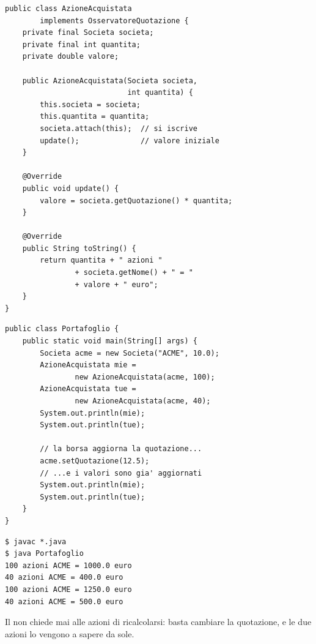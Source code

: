 \noindent\begin{minipage}[t]{0.49\textwidth}
\begin{lstlisting}[style=java, name=AzioneAcquistata.java]
public class AzioneAcquistata
        implements OsservatoreQuotazione {
    private final Societa societa;
    private final int quantita;
    private double valore;

    public AzioneAcquistata(Societa societa,
                            int quantita) {
        this.societa = societa;
        this.quantita = quantita;
        societa.attach(this);  // si iscrive
        update();              // valore iniziale
    }

    @Override
    public void update() {
        valore = societa.getQuotazione() * quantita;
    }

    @Override
    public String toString() {
        return quantita + " azioni "
                + societa.getNome() + " = "
                + valore + " euro";
    }
}
\end{lstlisting}
\end{minipage}\hfill
\begin{minipage}[t]{0.49\textwidth}
\begin{lstlisting}[style=java, name=Portafoglio.java]
public class Portafoglio {
    public static void main(String[] args) {
        Societa acme = new Societa("ACME", 10.0);
        AzioneAcquistata mie =
                new AzioneAcquistata(acme, 100);
        AzioneAcquistata tue =
                new AzioneAcquistata(acme, 40);
        System.out.println(mie);
        System.out.println(tue);

        // la borsa aggiorna la quotazione...
        acme.setQuotazione(12.5);
        // ...e i valori sono gia' aggiornati
        System.out.println(mie);
        System.out.println(tue);
    }
}
\end{lstlisting}
\begin{lstlisting}[style=shell, name=Terminale]
$ javac *.java
$ java Portafoglio
100 azioni ACME = 1000.0 euro
40 azioni ACME = 400.0 euro
100 azioni ACME = 1250.0 euro
40 azioni ACME = 500.0 euro
\end{lstlisting}
\end{minipage}

\medskip
Il  non chiede mai alle azioni di ricalcolarsi: basta cambiare la quotazione, e le due azioni lo vengono a
sapere da sole.

